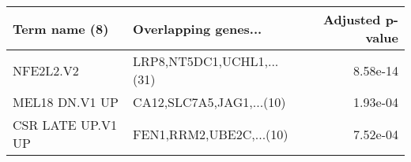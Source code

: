 \begin{tabular}{llr}
\toprule
    Term name (8) &      Overlapping genes... &  Adjusted p-value \\
\midrule
        NFE2L2.V2 & LRP8,NT5DC1,UCHL1,...(31) &          8.58e-14 \\
   MEL18 DN.V1 UP &  CA12,SLC7A5,JAG1,...(10) &          1.93e-04 \\
CSR LATE UP.V1 UP &   FEN1,RRM2,UBE2C,...(10) &          7.52e-04 \\
\bottomrule
\end{tabular}
